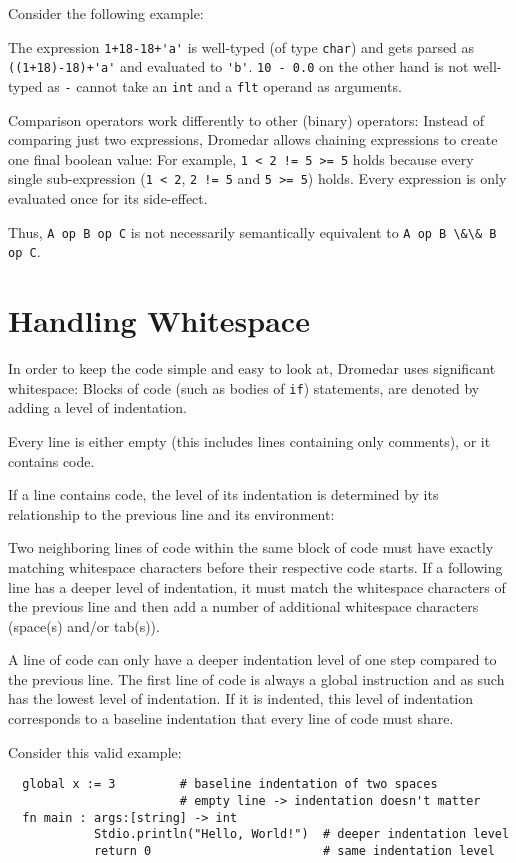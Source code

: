 \documentclass{article}
\newcommand{\code}[1]{\lstinline[columns=fixed]{#1}}
\begin{document}
		Consider the following example:
		
		The expression \code{1+18-18+'a'} is well-typed (of type \code{char}) and gets parsed as \code{((1+18)-18)+'a'} and evaluated to \code{'b'}. \code{10 - 0.0} on the other hand is not well-typed as \code{-} cannot take an \code{int} and a \code{flt} operand as arguments.
		
		Comparison operators work differently to other (binary) operators: Instead of comparing just two expressions, Dromedar allows chaining expressions to create one final boolean value: For example, \code{1 < 2 != 5 >= 5} holds because every single sub-expression (\code{1 < 2}, \code{2 != 5} and \code{5 >= 5}) holds. Every expression is only evaluated once for its side-effect.
		
		Thus, \code{A op B op C} is not necessarily semantically equivalent to \code{A op B \&\& B op C}.
		
	\section{Handling Whitespace}
	
		In order to keep the code simple and easy to look at, Dromedar uses significant whitespace: Blocks of code (such as bodies of \code{if}) statements, are denoted by adding a level of indentation.
		
		Every line is either empty (this includes lines containing only comments), or it contains code. 
		
		If a line contains code, the level of its indentation is determined by its relationship to the previous line and its environment:
		
		Two neighboring lines of code within the same block of code must have exactly matching whitespace characters before their respective code starts. If a following line has a deeper level of indentation, it must match the whitespace characters of the previous line and then add a number of additional whitespace characters (space(s) and/or tab(s)).
		
		A line of code can only have a deeper indentation level of one step compared to the previous line. The first line of code is always a global instruction and as such has the lowest level of indentation. If it is indented, this level of indentation corresponds to a baseline indentation that every line of code must share.
		
		Consider this valid example:
		
		\begin{lstlisting}
  global x := 3 		# baseline indentation of two spaces
						# empty line -> indentation doesn't matter
  fn main : args:[string] -> int
  			Stdio.println("Hello, World!")	# deeper indentation level
  			return 0						# same indentation level
		\end{lstlisting}
		
\end{document}
